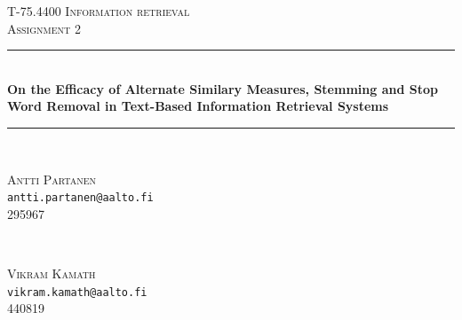 \begin{titlepage}

\newcommand{\HRule}{\rule{\linewidth}{0.5mm}} %

\center %


\textsc{\LARGE T-75.4400 Information retrieval}\\[1.5cm] %
\textsc{\large Assignment 2}\\[0.5cm] %


\HRule \\[0.4cm]
{ \huge \bfseries On the Efficacy of Alternate Similary Measures, Stemming and Stop Word Removal in 
Text-Based Information Retrieval Systems}\\[0.4cm] %
\HRule \\[1.5cm]
 

\begin{minipage}{0.45\textwidth}
\begin{center} \large
\textsc{Antti Partanen}\\ %
\texttt{antti.partanen@aalto.fi}\\
295967
\end{center}
\end{minipage}
~
\begin{minipage}{0.45\textwidth}
\begin{center} \large
\textsc{Vikram Kamath}\\ %
\texttt{vikram.kamath@aalto.fi}\\
440819
\end{center}
\end{minipage}\\[2cm]



\end{titlepage}
